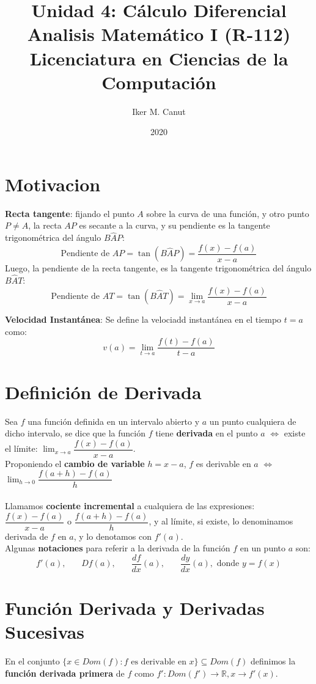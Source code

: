 \documentclass[11pt,a4paper]{article}
\author{Iker M. Canut}
\title{Unidad 4: C\'alculo Diferencial\\ Analisis Matem\'atico I (R-112)\\Licenciatura en Ciencias de la Computaci\'on}
\date{2020}
\begin{document}
\maketitle
\newpage

\section{Motivacion}
\textbf{Recta tangente}: fijando el punto $A$ sobre la curva de una funci\'on, y otro punto $P\not=A$, la recta $AP$ es secante a la curva, y su pendiente es la tangente trigonom\'etrica del \'angulo $B\hat{A}P$:
$$\text{Pendiente de $AP$} = \tan(B\hat{A}P) = \dfrac{f(x)-f(a)}{x-a}$$
\indent Luego, la pendiente de la recta tangente, es la tangente trigonom\'etrica del \'angulo $B\hat{A}T$:
$$\text{Pendiente de $AT$} = \tan(B\hat{A}T) = \displaystyle{\lim_{x \to a} \dfrac{f(x)-f(a)}{x-a}}$$

\noindent \textbf{Velocidad Instant\'anea}: Se define la velociadd instant\'anea en el tiempo $t=a$ como:
$$v(a) = \displaystyle{\lim_{t \to a} \dfrac{f(t)-f(a)}{t-a}}$$

\section{Definici\'on de Derivada}
\indent \indent Sea $f$ una funci\'on definida en un intervalo abierto y $a$ un punto cualquiera de dicho intervalo, se dice que la funci\'on $f$ tiene \textbf{derivada} en el punto $a$ $\iff$ existe el l\'imite: $\displaystyle{\lim_{x \to a} \dfrac{f(x)-f(a)}{x-a}}$.\\
\indent Proponiendo el \textbf{cambio de variable} $h=x-a$, $f$ es derivable en $a$ $\iff$ $\displaystyle{\lim_{h \to 0} \dfrac{f(a+h)-f(a)}{h}}$\\ \\

Llamamos \textbf{cociente incremental} a cualquiera de las expresiones: $\dfrac{f(x)-f(a)}{x-a}$ o $\dfrac{f(a+h)-f(a)}{h}$, y al l\'imite, si existe, lo denominamos derivada de $f$ en $a$, y lo denotamos con $f'(a)$.\\

Algunas \textbf{notaciones} para referir a la derivada de la funci\'on $f$ en un punto $a$ son:
$$f'(a),\ \ \ \ \ \ \ \ Df(a),\ \ \ \ \ \ \ \ \dfrac{df}{dx}(a),\ \ \ \ \ \ \ \ \dfrac{dy}{dx}(a), \text{ donde $y=f(x)$}$$

\section{Funci\'on Derivada y Derivadas Sucesivas}
\indent \indent En el conjunto $\{x \in Dom(f) : f \text{ es derivable en $x$}\} \subseteq Dom(f)$ definimos la \textbf{funci\'on derivada primera} de $f$ como $f' : Dom(f') \rightarrow \mathbb{R}, x\rightarrow f'(x)$.\\
\end{document}
